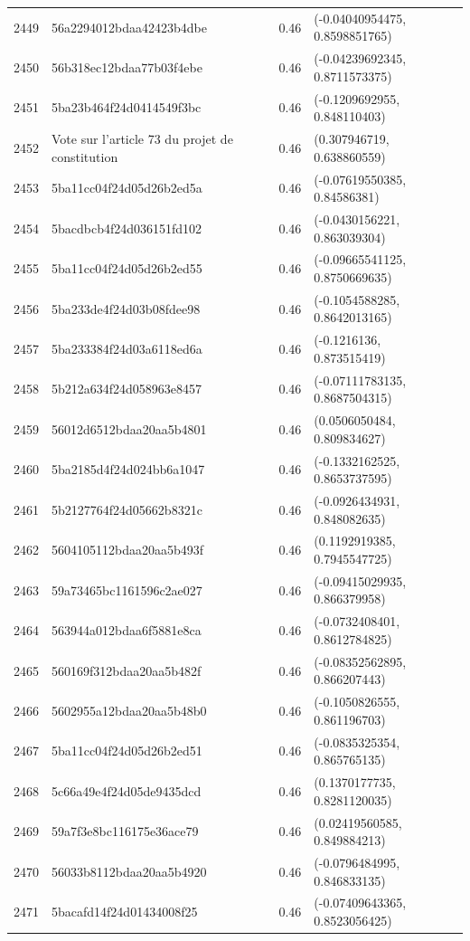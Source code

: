 \begin{table}[ht]
\begin{tabular}{rlrl}
  2449 & 56a2294012bdaa42423b4dbe & 0.46 & (-0.04040954475, 0.8598851765) \\ 
  2450 & 56b318ec12bdaa77b03f4ebe & 0.46 & (-0.04239692345, 0.8711573375) \\ 
  2451 & 5ba23b464f24d0414549f3bc & 0.46 & (-0.1209692955, 0.848110403) \\ 
  2452 & Vote sur l'article 73 du projet de constitution & 0.46 & (0.307946719, 0.638860559) \\ 
  2453 & 5ba11cc04f24d05d26b2ed5a & 0.46 & (-0.07619550385, 0.84586381) \\ 
  2454 & 5bacdbcb4f24d036151fd102 & 0.46 & (-0.0430156221, 0.863039304) \\ 
  2455 & 5ba11cc04f24d05d26b2ed55 & 0.46 & (-0.09665541125, 0.8750669635) \\ 
  2456 & 5ba233de4f24d03b08fdee98 & 0.46 & (-0.1054588285, 0.8642013165) \\ 
  2457 & 5ba233384f24d03a6118ed6a & 0.46 & (-0.1216136, 0.873515419) \\ 
  2458 & 5b212a634f24d058963e8457 & 0.46 & (-0.07111783135, 0.8687504315) \\ 
  2459 & 56012d6512bdaa20aa5b4801 & 0.46 & (0.0506050484, 0.809834627) \\ 
  2460 & 5ba2185d4f24d024bb6a1047 & 0.46 & (-0.1332162525, 0.8653737595) \\ 
  2461 & 5b2127764f24d05662b8321c & 0.46 & (-0.0926434931, 0.848082635) \\ 
  2462 & 5604105112bdaa20aa5b493f & 0.46 & (0.1192919385, 0.7945547725) \\ 
  2463 & 59a73465bc1161596c2ae027 & 0.46 & (-0.09415029935, 0.866379958) \\ 
  2464 & 563944a012bdaa6f5881e8ca & 0.46 & (-0.0732408401, 0.8612784825) \\ 
  2465 & 560169f312bdaa20aa5b482f & 0.46 & (-0.08352562895, 0.866207443) \\ 
  2466 & 5602955a12bdaa20aa5b48b0 & 0.46 & (-0.1050826555, 0.861196703) \\ 
  2467 & 5ba11cc04f24d05d26b2ed51 & 0.46 & (-0.0835325354, 0.865765135) \\ 
  2468 & 5c66a49e4f24d05de9435dcd & 0.46 & (0.1370177735, 0.8281120035) \\ 
  2469 & 59a7f3e8bc116175e36ace79 & 0.46 & (0.02419560585, 0.849884213) \\ 
  2470 & 56033b8112bdaa20aa5b4920 & 0.46 & (-0.0796484995, 0.846833135) \\ 
  2471 & 5bacafd14f24d01434008f25 & 0.46 & (-0.07409643365, 0.8523056425) \\ 

\end{tabular}
\end{table}
